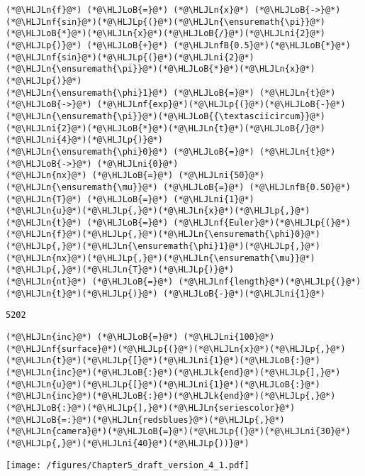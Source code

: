 \documentclass[12pt,landscape]{article}
\newcommand{\HLJLk}[1]{\textcolor[RGB]{148,91,176}{\textbf{#1}}}
\newcommand{\HLJLn}[1]{#1}
\newcommand{\HLJLnf}[1]{\textcolor[RGB]{66,102,213}{#1}}
\newcommand{\HLJLnfB}[1]{\textcolor[RGB]{59,151,46}{#1}}
\newcommand{\HLJLni}[1]{\textcolor[RGB]{59,151,46}{#1}}
\newcommand{\HLJLoB}[1]{\textcolor[RGB]{102,102,102}{\textbf{#1}}}
\newcommand{\HLJLp}[1]{#1}
\begin{document}
{\begin{lstlisting}
(*@\HLJLn{f}@*) (*@\HLJLoB{=}@*) (*@\HLJLn{x}@*) (*@\HLJLoB{->}@*) (*@\HLJLnf{sin}@*)(*@\HLJLp{(}@*)(*@\HLJLn{\ensuremath{\pi}}@*)(*@\HLJLoB{*}@*)(*@\HLJLn{x}@*)(*@\HLJLoB{/}@*)(*@\HLJLni{2}@*)(*@\HLJLp{)}@*) (*@\HLJLoB{+}@*) (*@\HLJLnfB{0.5}@*)(*@\HLJLoB{*}@*)(*@\HLJLnf{sin}@*)(*@\HLJLp{(}@*)(*@\HLJLni{2}@*)(*@\HLJLn{\ensuremath{\pi}}@*)(*@\HLJLoB{*}@*)(*@\HLJLn{x}@*)(*@\HLJLp{)}@*)
(*@\HLJLn{\ensuremath{\phi}1}@*) (*@\HLJLoB{=}@*) (*@\HLJLn{t}@*) (*@\HLJLoB{->}@*) (*@\HLJLnf{exp}@*)(*@\HLJLp{(}@*)(*@\HLJLoB{-}@*)(*@\HLJLn{\ensuremath{\pi}}@*)(*@\HLJLoB{{\textasciicircum}}@*)(*@\HLJLni{2}@*)(*@\HLJLoB{*}@*)(*@\HLJLn{t}@*)(*@\HLJLoB{/}@*)(*@\HLJLni{4}@*)(*@\HLJLp{)}@*)
(*@\HLJLn{\ensuremath{\phi}0}@*) (*@\HLJLoB{=}@*) (*@\HLJLn{t}@*) (*@\HLJLoB{->}@*) (*@\HLJLni{0}@*)
(*@\HLJLn{nx}@*) (*@\HLJLoB{=}@*) (*@\HLJLni{50}@*)
(*@\HLJLn{\ensuremath{\mu}}@*) (*@\HLJLoB{=}@*) (*@\HLJLnfB{0.50}@*)
(*@\HLJLn{T}@*) (*@\HLJLoB{=}@*) (*@\HLJLni{1}@*)
(*@\HLJLn{u}@*)(*@\HLJLp{,}@*)(*@\HLJLn{x}@*)(*@\HLJLp{,}@*)(*@\HLJLn{t}@*) (*@\HLJLoB{=}@*) (*@\HLJLnf{Euler}@*)(*@\HLJLp{(}@*)(*@\HLJLn{f}@*)(*@\HLJLp{,}@*)(*@\HLJLn{\ensuremath{\phi}0}@*)(*@\HLJLp{,}@*)(*@\HLJLn{\ensuremath{\phi}1}@*)(*@\HLJLp{,}@*)(*@\HLJLn{nx}@*)(*@\HLJLp{,}@*)(*@\HLJLn{\ensuremath{\mu}}@*)(*@\HLJLp{,}@*)(*@\HLJLn{T}@*)(*@\HLJLp{)}@*)
(*@\HLJLn{nt}@*) (*@\HLJLoB{=}@*) (*@\HLJLnf{length}@*)(*@\HLJLp{(}@*)(*@\HLJLn{t}@*)(*@\HLJLp{)}@*) (*@\HLJLoB{-}@*)(*@\HLJLni{1}@*)
\end{lstlisting}

\begin{lstlisting}
5202
\end{lstlisting}


\begin{lstlisting}
(*@\HLJLn{inc}@*) (*@\HLJLoB{=}@*) (*@\HLJLni{100}@*)
(*@\HLJLnf{surface}@*)(*@\HLJLp{(}@*)(*@\HLJLn{x}@*)(*@\HLJLp{,}@*)(*@\HLJLn{t}@*)(*@\HLJLp{[}@*)(*@\HLJLni{1}@*)(*@\HLJLoB{:}@*)(*@\HLJLn{inc}@*)(*@\HLJLoB{:}@*)(*@\HLJLk{end}@*)(*@\HLJLp{],}@*)(*@\HLJLn{u}@*)(*@\HLJLp{[}@*)(*@\HLJLni{1}@*)(*@\HLJLoB{:}@*)(*@\HLJLn{inc}@*)(*@\HLJLoB{:}@*)(*@\HLJLk{end}@*)(*@\HLJLp{,}@*)(*@\HLJLoB{:}@*)(*@\HLJLp{],}@*)(*@\HLJLn{seriescolor}@*)(*@\HLJLoB{=:}@*)(*@\HLJLn{redsblues}@*)(*@\HLJLp{,}@*) (*@\HLJLn{camera}@*)(*@\HLJLoB{=}@*)(*@\HLJLp{(}@*)(*@\HLJLni{30}@*)(*@\HLJLp{,}@*)(*@\HLJLni{40}@*)(*@\HLJLp{))}@*)
\end{lstlisting}

\texttt{[image: /figures/Chapter5\_draft\_version\_4\_1.pdf]}

}
\end{document}
